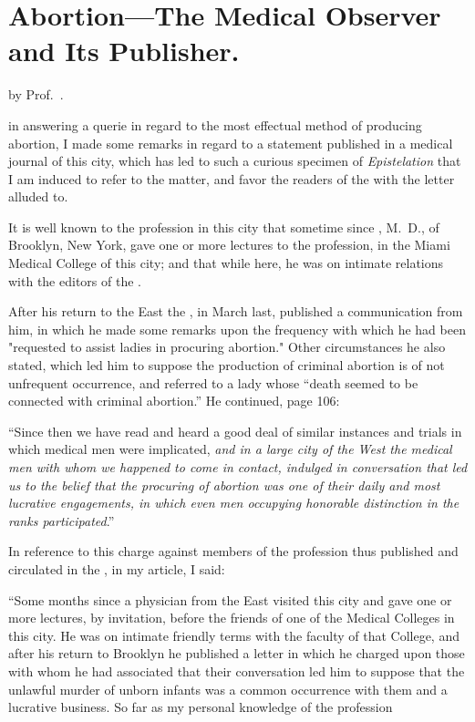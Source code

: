 \section*{Abortion---The  Medical  Observer and
Its Publisher.}

by Prof.~.

 in answering a querie in regard to the
most effectual method of producing abortion, I made some remarks in
regard to a statement published in a medical journal of this city, which
has led to such a curious specimen of \emph{Epistelation} that I am induced
to refer to the matter, and favor the readers of the  with the
letter alluded to.

It is well known to the profession in this city that sometime since
, M.~D., of Brooklyn, New York, gave one or more lectures
to the profession, in the Miami Medical College of this city; and that
while here, he was on intimate relations with the editors of the .

After his return to the East the , in March last, published a
communication from him, in which he made some remarks upon the
frequency with which he had been "requested to assist ladies in procuring
abortion." Other circumstances he also stated, which led him to
suppose the production of criminal abortion is of not unfrequent occurrence,
and referred to a lady whose ``death seemed to be connected with
criminal abortion.''   He continued, page 106:

``Since then we have read and heard a good deal of similar instances
and trials in which medical men were implicated, \emph{and in a large city
of the West the medical men with whom we happened to come in
contact, indulged in conversation that led us to the belief that the
procuring of abortion was one of their daily and most lucrative
engagements, in which even men occupying honorable distinction in
the ranks participated}.''

In reference to this charge against members of the profession thus
published and circulated in the , in my article, I
said:

``Some months since a physician from the East visited this city and
gave one or more lectures, by invitation, before the friends of one of
the Medical Colleges in this city. He was on intimate friendly terms
with the faculty of that College, and after his return to Brooklyn he
published a letter in which he charged upon those with whom he had
associated that their conversation led him to suppose that the unlawful
murder of unborn infants was a common occurrence with them and a
lucrative business.   So far as my personal knowledge of the profession\endinput
